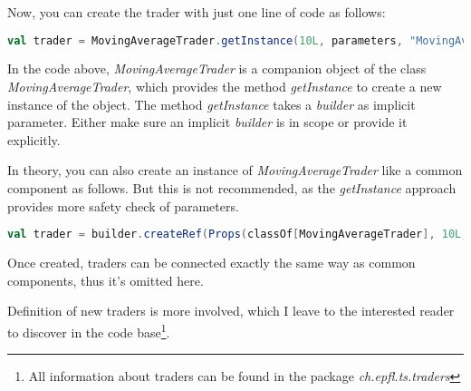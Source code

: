 Now, you can create the trader with just one line of code as follows:

\begin{lstlisting}[language=Scala]
  val trader = MovingAverageTrader.getInstance(10L, parameters, "MovingAverageTrader")
\end{lstlisting}

In the code above, \emph{MovingAverageTrader} is a companion object of the class \emph{MovingAverageTrader}, which provides the method \emph{getInstance} to create a new instance of the object. The method \emph{getInstance} takes a \emph{builder} as implicit parameter. Either make sure an implicit \emph{builder} is in scope or provide it explicitly.

\begin{warning}
In theory, you can also create an instance of \emph{MovingAverageTrader} like a common component as follows. But this is not recommended, as the \emph{getInstance} approach provides more safety check of parameters.

\begin{lstlisting}[language=Scala]
  val trader = builder.createRef(Props(classOf[MovingAverageTrader], 10L, parameters), "trader")
\end{lstlisting}
\end{warning}

Once created, traders can be connected exactly the same way as common components, thus it's omitted here.

Definition of new traders is more involved, which I leave to the interested reader to discover in the code base\footnote{All information about traders can be found in the package \emph{ch.epfl.ts.traders}}.
